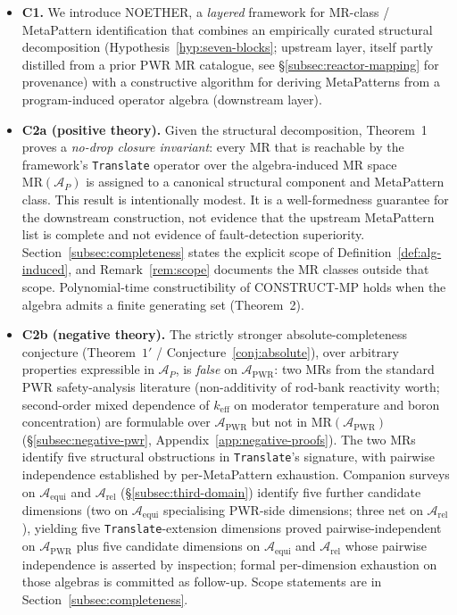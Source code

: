 \documentclass[acmsmall,screen,review]{acmart}
\begin{document}
\begin{itemize}
  \item \textbf{C1.} We introduce NOETHER, a \emph{layered} framework for MR-class / MetaPattern identification that combines an empirically curated structural decomposition (Hypothesis~\ref{hyp:seven-blocks}; upstream layer, itself partly distilled from a prior PWR MR catalogue, see \S\ref{subsec:reactor-mapping} for provenance) with a constructive algorithm for deriving MetaPatterns from a program-induced operator algebra (downstream layer).
  \item \textbf{C2a (positive theory).} Given the structural decomposition, Theorem~1 proves a \emph{no-drop closure invariant}: every MR that is reachable by the framework's \texttt{Translate} operator over the algebra-induced MR space $\mathrm{MR}(\mathcal{A}_{P})$ is assigned to a canonical structural component and MetaPattern class. This result is intentionally modest. It is a well-formedness guarantee for the downstream construction, not evidence that the upstream MetaPattern list is complete and not evidence of fault-detection superiority. Section~\ref{subsec:completeness} states the explicit scope of Definition~\ref{def:alg-induced}, and Remark~\ref{rem:scope} documents the MR classes outside that scope. Polynomial-time constructibility of CONSTRUCT-MP holds when the algebra admits a finite generating set (Theorem~2).
  \item \textbf{C2b (negative theory).} The strictly stronger absolute-completeness conjecture (Theorem~$1'$ / Conjecture~\ref{conj:absolute}), over arbitrary properties expressible in $\mathcal{A}_P$, is \emph{false} on $\mathcal{A}_{\mathrm{PWR}}$: two MRs from the standard PWR safety-analysis literature (non-additivity of rod-bank reactivity worth; second-order mixed dependence of $k_{\mathrm{eff}}$ on moderator temperature and boron concentration) are formulable over $\mathcal{A}_{\mathrm{PWR}}$ but not in $\mathrm{MR}(\mathcal{A}_{\mathrm{PWR}})$ (\S\ref{subsec:negative-pwr}, Appendix~\ref{app:negative-proofs}). The two MRs identify five structural obstructions in \texttt{Translate}'s signature, with pairwise independence established by per-MetaPattern exhaustion. Companion surveys on $\mathcal{A}_{\mathrm{equi}}$ and $\mathcal{A}_{\mathrm{rel}}$ (\S\ref{subsec:third-domain}) identify five further candidate dimensions (two on $\mathcal{A}_{\mathrm{equi}}$ specialising PWR-side dimensions; three net on $\mathcal{A}_{\mathrm{rel}}$), yielding five \texttt{Translate}-extension dimensions proved pairwise-independent on $\mathcal{A}_{\mathrm{PWR}}$ plus five candidate dimensions on $\mathcal{A}_{\mathrm{equi}}$ and $\mathcal{A}_{\mathrm{rel}}$ whose pairwise independence is asserted by inspection; formal per-dimension exhaustion on those algebras is committed as follow-up. Scope statements are in Section~\ref{subsec:completeness}.

\end{itemize}
\end{document}
